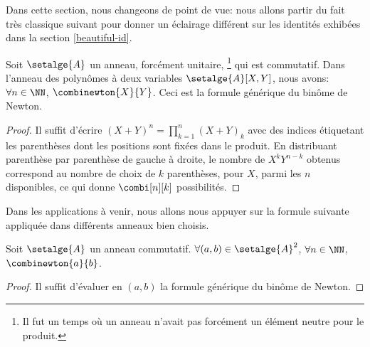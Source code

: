 Dans cette section, nous changeons de point de vue: nous allons partir du fait très classique suivant pour donner un éclairage différent sur les identités exhibées dans la section \ref{beautiful-id}.




\begin{fact} \label{bino-id-formal}
	Soit $\setalge{A}$ un anneau, forcément unitaire,%
	\footnote{
        Il fut un temps où un anneau n'avait pas forcément un élément neutre pour le produit.
	}
	qui est commutatif.
	Dans l'anneau des polynômes à deux variables $\setalge{A}[X, Y]$, nous avons:
	$\forall n \in \NN$,
	$\combinewton{X}{Y}$.
	Ceci est la formule générique du binôme de Newton.
\end{fact}


\begin{proof}
	Il suffit d'écrire $(X + Y)^n = \prod_{k=1}^{n} (X + Y)_k$ avec des indices étiquetant les parenthèses dont les positions sont fixées dans le produit.
    En distribuant parenthèse par parenthèse de gauche à droite, le nombre de $X^k Y^{n-k}$ obtenus correspond au nombre de choix de $k$ parenthèses, pour $X$, parmi les $n$ disponibles, ce qui donne $\combi[n][k]$ possibilités.
\end{proof}




Dans les applications à venir, nous allons nous appuyer sur la formule suivante appliquée dans différents anneaux bien choisis.


\begin{fact} \label{bino-id-a-b}
	Soit $\setalge{A}$ un anneau commutatif.
	$\forall (a, b) \in \setalge{A}^2$,
	$\forall n \in \NN$,
	$\combinewton{a}{b}$.
\end{fact}


\begin{proof}
	Il suffit d'évaluer en $(a, b)$ la formule générique du binôme de Newton.
\end{proof}
